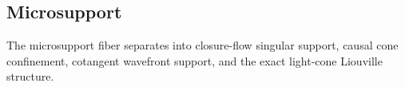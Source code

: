 \subsection{Microsupport}

The microsupport fiber separates into closure-flow singular support, causal
cone confinement, cotangent wavefront support, and the exact light-cone
Liouville structure.






